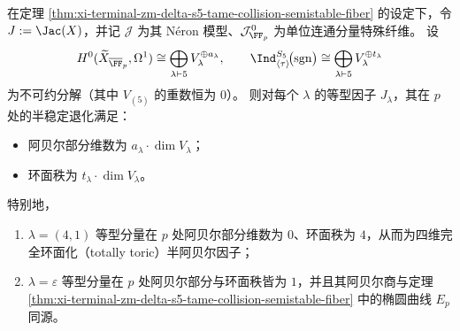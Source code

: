 \begin{corollary}\label{cor:xi-terminal-zm-delta-s5-tame-collision-isotypic-neron-split}
在定理 \ref{thm:xi-terminal-zm-delta-s5-tame-collision-semistable-fiber} 的设定下，令 \(J:=\Jac(X)\)，并记 \(\mathcal J\) 为其 N\'eron 模型、\(\mathcal J^0_{\FF_p}\) 为单位连通分量特殊纤维。
设
\[
H^0(\widetilde X_{\overline{\FF}_p},\Omega^1)\cong \bigoplus_{\lambda\vdash 5}V_\lambda^{\oplus a_\lambda},
\qquad
\Ind^{S_5}_{\langle\tau\rangle}\!\bigl(\mathrm{sgn}\bigr)\cong \bigoplus_{\lambda\vdash 5}V_\lambda^{\oplus t_\lambda}
\]
为不可约分解（其中 \(V_{(5)}\) 的重数恒为 \(0\)）。
则对每个 \(\lambda\) 的等型因子 \(J_\lambda\)，其在 \(p\) 处的半稳定退化满足：
\begin{itemize}
  \item 阿贝尔部分维数为 \(a_\lambda\cdot \dim V_\lambda\)；
  \item 环面秩为 \(t_\lambda\cdot \dim V_\lambda\)。
\end{itemize}
特别地，
\begin{enumerate}
  \item \(\lambda=(4,1)\) 等型分量在 \(p\) 处阿贝尔部分维数为 \(0\)、环面秩为 \(4\)，从而为四维完全环面化（totally toric）半阿贝尔因子；
  \item \(\lambda=\varepsilon\) 等型分量在 \(p\) 处阿贝尔部分与环面秩皆为 \(1\)，并且其阿贝尔商与定理 \ref{thm:xi-terminal-zm-delta-s5-tame-collision-semistable-fiber} 中的椭圆曲线 \(E_p\) 同源。
\end{enumerate}
\end{corollary}
